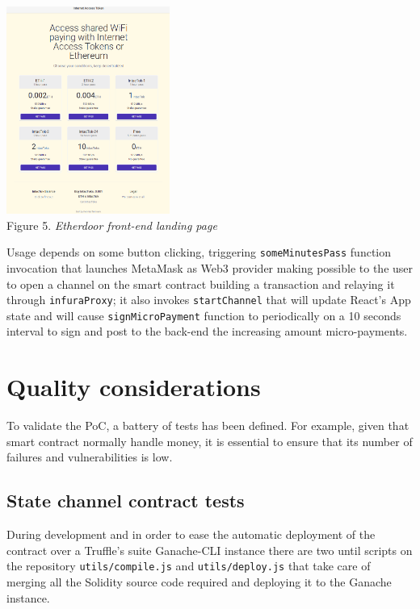 \documentclass[12pt]{amsart}
\begin{document}
\begin{multicols}{2}
\begin{center}
  \includegraphics[keepaspectratio, width=0.4\textwidth]{images/portal-y.eps}
  \\
  Figure 5. \textit{Etherdoor front-end landing page}
\end{center}

Usage depends on some button clicking, triggering
\texttt{someMinutesPass} function invocation that launches MetaMask
as Web3 provider making possible to the user to open a channel
on the smart contract building a transaction and relaying it
through \texttt{infuraProxy}; it also invokes \texttt{startChannel}
that will update React's App state and will cause
\texttt{signMicroPayment} function to periodically on a 10 seconds
interval to sign and post to the back-end the increasing amount
micro-payments.

\section{Quality considerations}\label{sec:proofs}

\vspace{0.35cm}

To validate the PoC, a battery of tests has
been defined. For example, given
that smart contract normally handle money,
it is essential to ensure that
its number of failures and vulnerabilities is low\cite{Hegedus18}.

\subsection{State channel contract tests}

\vspace{0.35cm}

During development and in order to ease
the automatic deployment of the contract
over a Truffle's suite Ganache-CLI\cite{ganache}
instance there are two until scripts on the
repository\cite{state-channel-contract-a}
\texttt{utils/compile.js} and \texttt{utils/deploy.js}
that take care of merging all the Solidity source
code required and deploying it to the Ganache instance.


\end{multicols}
\end{document}
